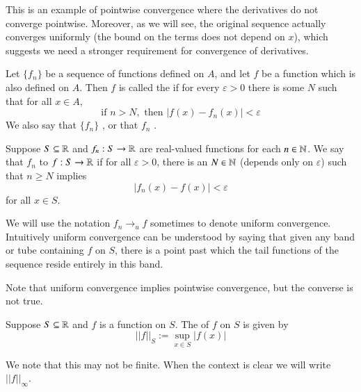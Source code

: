 This is an example of pointwise convergence where the derivatives do not converge pointwise. Moreover, as we will see, the original sequence actually converges uniformly (the bound on the terms does not depend on $x$), which suggests we need a stronger requirement for convergence of derivatives.





\begin{defn}
    Let $\{f_n\}$ be a sequence of functions defined on $A$, and let $f$ be a function which is also defined on $A$. Then $f$ is called the  if for every $\varepsilon > 0$ there is some $N$ such that for all $x \in A$, \begin{equation*}
        \text{if } n> N, \text{ then } |f(x) - f_n(x)| < \varepsilon
    \end{equation*}
    We also say that $\{f_n\}$ , or that $f_n$ .
\end{defn}


\begin{defn}
    Suppose $S \subseteq \mathbb R$ and $f_n:S\rightarrow \mathbb R$ are real-valued functions for each $n \in \mathbb N$. We say that $f_n$  to $f:S\rightarrow \mathbb R$ if for all $\varepsilon > 0$, there is an $N \in \mathbb N$ (depends only on $\varepsilon$) such that $n \geq N$ implies \begin{equation*}
        |f_n(x) - f(x)| < \varepsilon
    \end{equation*}
    for all $x \in S$.
\end{defn}

We will use the notation $f_n\rightarrow_uf$ sometimes to denote uniform convergence. Intuitively uniform convergence can be understood by saying that given any band or tube containing $f$ on $S$, there is a point past which the tail functions of the sequence reside entirely in this band.

\begin{rmk}
    Note that uniform convergence implies pointwise convergence, but the converse is not true.
\end{rmk}

\begin{defn}
    Suppose $S \subseteq \mathbb R$ and $f$ is a function on $S$. The  of $f$ on $S$ is given by \begin{equation*}
        ||f||_S := \sup\limits_{x\in S}|f(x)|
    \end{equation*}
\end{defn}
We note that this may not be finite. When the context is clear we will write $||f||_{\infty}$.

